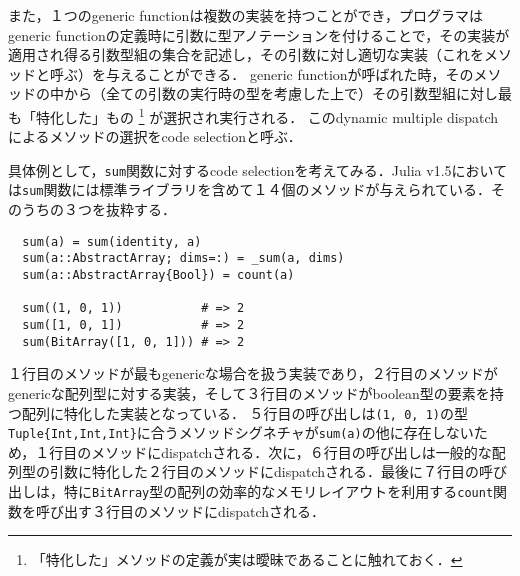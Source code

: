 また，１つのgeneric functionは複数の実装を持つことができ，プログラマはgeneric functionの定義時に引数に型アノテーションを付けることで，その実装が適用され得る引数型組の集合を記述し，その引数に対し適切な実装（これをメソッドと呼ぶ）を与えることができる．
generic functionが呼ばれた時，そのメソッドの中から（全ての引数の実行時の型を考慮した上で）その引数型組に対し最も「特化した」もの
\footnote{
  「特化した」メソッドの定義が実は曖昧であることに触れておく．
}
が選択され実行される．
このdynamic multiple dispatchによるメソッドの選択をcode selectionと呼ぶ．

\newpage

具体例として，\texttt{sum}関数に対するcode selectionを考えてみる．Julia v1.5においては\texttt{sum}関数には標準ライブラリを含めて１４個のメソッドが与えられている．そのうちの３つを抜粋する．

\begin{verbatim}
  sum(a) = sum(identity, a)
  sum(a::AbstractArray; dims=:) = _sum(a, dims)
  sum(a::AbstractArray{Bool}) = count(a)

  sum((1, 0, 1))           # => 2
  sum([1, 0, 1])           # => 2
  sum(BitArray([1, 0, 1])) # => 2
\end{verbatim}

１行目のメソッドが最もgenericな場合を扱う実装であり，２行目のメソッドがgenericな配列型に対する実装，そして３行目のメソッドがboolean型の要素を持つ配列に特化した実装となっている．
５行目の呼び出しは\texttt{(1, 0, 1)}の型\texttt{Tuple\{Int,Int,Int\}}に合うメソッドシグネチャが\texttt{sum(a)}の他に存在しないため，１行目のメソッドにdispatchされる．次に，６行目の呼び出しは一般的な配列型の引数に特化した２行目のメソッドにdispatchされる．最後に７行目の呼び出しは，特に\texttt{BitArray}型の配列の効率的なメモリレイアウトを利用する\texttt{count}関数を呼び出す３行目のメソッドにdispatchされる．

